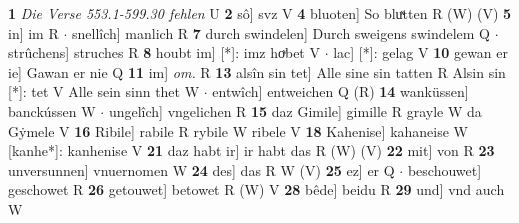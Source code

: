 \documentclass[8pt,a4paper,notitlepage]{article}
\begin{document}
\begin{table}[ht]
\begin{minipage}[t]{0.5\linewidth}
\textbf{1} \textit{Die Verse 553.1-599.30 fehlen} U  \textbf{2} sô] svz V \textbf{4} bluoten] So bluͯtten R (W) (V) \textbf{5} in] im R  $\cdot$ snellîch] manlich R \textbf{7} durch swindelen] Durch sweigens swindelem Q  $\cdot$ strûchens] struches R \textbf{8} houbt im] [*]: imz hoͮbet V  $\cdot$ lac] [*]: gelag V \textbf{10} gewan er ie] Gawan er nie Q \textbf{11} im] \textit{om.} R \textbf{13} alsîn sin tet] Alle sine sin tatten R Alsin sin [*]: tet V Alle sein sinn thet W  $\cdot$ entwîch] entweichen Q (R) \textbf{14} wanküssen] banckússen W  $\cdot$ ungelîch] vngelichen R \textbf{15} daz Gimile] gimille R grayle W da Gẏmele V \textbf{16} Ribile] rabile R rybile W ribele V \textbf{18} Kahenise] kahaneise W [kanhe*]: kanhenise V \textbf{21} daz habt ir] ir habt das R (W) (V) \textbf{22} mit] von R \textbf{23} unversunnen] vnuernomen W \textbf{24} des] das R W (V) \textbf{25} ez] er Q  $\cdot$ beschouwet] geschowet R \textbf{26} getouwet] betowet R (W) V \textbf{28} bêde] beidu R \textbf{29} und] vnd auch W \newline
\end{minipage}
\end{table}
\end{document}
